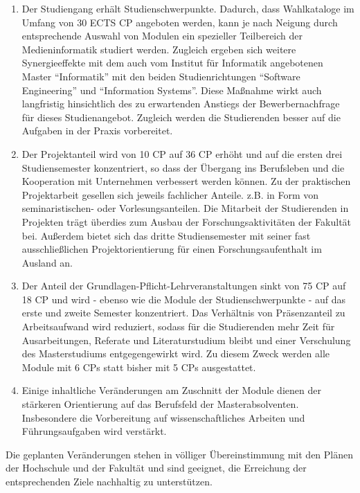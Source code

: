 \begin{enumerate}
\def\labelenumi{\arabic{enumi}.}
\tightlist
\item
  Der Studiengang erhält Studienschwerpunkte. Dadurch, dass Wahlkataloge
  im Umfang von 30 ECTS CP angeboten werden, kann je nach Neigung durch
  entsprechende Auswahl von Modulen ein spezieller Teilbereich der
  Medieninformatik studiert werden. Zugleich ergeben sich weitere
  Synergieeffekte mit dem auch vom Institut für Informatik angebotenen
  Master ``Informatik'' mit den beiden Studienrichtungen ``Software
  Engineering'' und ``Information Systems''. Diese Maßnahme wirkt auch
  langfristig hinsichtlich des zu erwartenden Anstiegs der
  Bewerbernachfrage für dieses Studienangebot. Zugleich werden die
  Studierenden besser auf die Aufgaben in der Praxis vorbereitet.
\item
  Der Projektanteil wird von 10 CP auf 36 CP erhöht und auf die ersten
  drei Studiensemester konzentriert, so dass der Übergang ins
  Berufsleben und die Kooperation mit Unternehmen verbessert werden
  können. Zu der praktischen Projektarbeit gesellen sich jeweils
  fachlicher Anteile. z.B. in Form von seminaristischen- oder
  Vorlesungsanteilen. Die Mitarbeit der Studierenden in Projekten trägt
  überdies zum Ausbau der Forschungsaktivitäten der Fakultät bei.
  Außerdem bietet sich das dritte Studiensemester mit seiner fast
  ausschließlichen Projektorientierung für einen Forschungsaufenthalt im
  Ausland an.
\item
  Der Anteil der Grundlagen-Pflicht-Lehrveranstaltungen sinkt von 75 CP
  auf 18 CP und wird - ebenso wie die Module der Studienschwerpunkte -
  auf das erste und zweite Semester konzentriert. Das Verhältnis von
  Präsenzanteil zu Arbeitsaufwand wird reduziert, sodass für die
  Studierenden mehr Zeit für Ausarbeitungen, Referate und
  Literaturstudium bleibt und einer Verschulung des Masterstudiums
  entgegengewirkt wird. Zu diesem Zweck werden alle Module mit 6 CPs
  statt bisher mit 5 CPs ausgestattet.
\item
  Einige inhaltliche Veränderungen am Zuschnitt der Module dienen der
  stärkeren Orientierung auf das Berufsfeld der Masterabsolventen.
  Insbesondere die Vorbereitung auf wissenschaftliches Arbeiten und
  Führungsaufgaben wird verstärkt.
\end{enumerate}

Die geplanten Veränderungen stehen in völliger Übereinstimmung mit den
Plänen der Hochschule und der Fakultät und sind geeignet, die Erreichung
der entsprechenden Ziele nachhaltig zu unterstützen.
